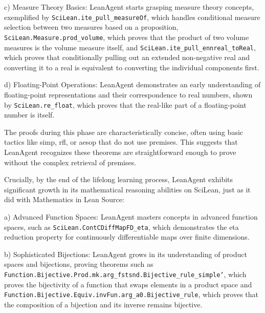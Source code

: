 \documentclass{article} %
\begin{document}
c) Measure Theory Basics:
LeanAgent starts grasping measure theory concepts, exemplified by \texttt{SciLean.ite\_pull\_measureOf}, which handles conditional measure selection between two measures based on a proposition, \texttt{SciLean.Measure.prod\_volume}, which proves that the product of two volume measures is the volume measure itself, and \texttt{SciLean.ite\_pull\_ennreal\_toReal}, which proves that conditionally pulling out an extended non-negative real and converting it to a real is equivalent to converting the individual components first.

d) Floating-Point Operations:
LeanAgent demonstrates an early understanding of floating-point representations and their correspondence to real numbers, shown by \texttt{SciLean.re\_float}, which proves that the real-like part of a floating-point number is itself.



The proofs during this phase are characteristically concise, often using basic tactics like simp, rfl, or aesop that do not use premises. This suggests that LeanAgent recognizes these theorems are straightforward enough to prove without the complex retrieval of premises.

Crucially, by the end of the lifelong learning process, LeanAgent exhibits significant growth in its mathematical reasoning abilities on SciLean, just as it did with Mathematics in Lean Source:

a) Advanced Function Spaces: LeanAgent masters concepts in advanced function spaces, such as \texttt{SciLean.ContCDiffMapFD\_eta}, which demonstrates the eta reduction property for continuously differentiable maps over finite dimensions.

b) Sophisticated Bijections:
LeanAgent grows in its understanding of product spaces and bijections, proving theorems such as \texttt{Function.Bijective.Prod.mk.arg\_fstsnd.Bijective\_rule\_simple'}, which proves the bijectivity of a function that swaps elements in a product space and \texttt{Function.Bijective.Equiv.invFun.arg\_a0.Bijective\_rule}, which proves that the composition of a bijection and its inverse remains bijective.
\end{document}
